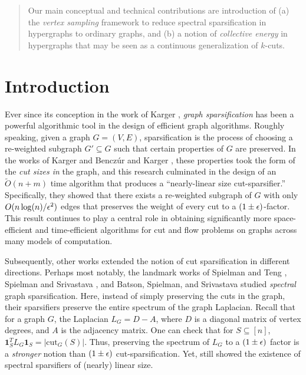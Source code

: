 \documentclass{article}
\begin{document}
\begin{abstract}
Our main conceptual and technical contributions are introduction of (a) the \textit{vertex sampling} framework to reduce spectral sparsification in hypergraphs to ordinary graphs, and (b)   
a notion of \textit{collective energy} in hypergraphs that may be seen
as a continuous generalization of $k$-cuts. 

\end{abstract}

\pagebreak

\setcounter{tocdepth}{2}
\tableofcontents

\pagebreak


\section{Introduction}

Ever since its conception in the work of Karger \cite{Kar93}, \emph{graph sparsification} has been a powerful algorithmic tool in the design of efficient graph algorithms. Roughly speaking, given a graph $G = (V, E)$, sparsification is the process of choosing a re-weighted subgraph $G' \subseteq G$ such that certain properties of $G$ are preserved. In the works of Karger \cite{Kar93} and Bencz\'ur and Karger \cite{BK96}, these properties took the form of the \emph{cut sizes in} the graph, and this research culminated in the design of an $\widetilde{O}(n + m)$ time algorithm that produces a ``nearly-linear size cut-sparsifier.'' Specifically, they showed that there exists a re-weighted subgraph of $G$ with only $O(n \log (n) / \epsilon^2)$ edges that preserves the weight of every cut to a $(1 \pm \epsilon)$-factor. This result continues to play a central role in obtaining significantly more space-efficient and time-efficient algorithms for cut and flow problems on graphs across many models of computation.


Subsequently, other works extended the notion of cut sparsification in different directions. Perhaps most notably, the landmark
works of Spielman and Teng \cite{ST11},
Spielman and Srivastava \cite{SS11},
and Batson, Spielman, and Srivastava \cite{BatsonSS12} studied \emph{spectral} graph sparsification. Here, instead of simply preserving the cuts in the graph, their sparsifiers preserve the entire spectrum of the graph Laplacian. Recall that for a graph $G$, the Laplacian $L_G = D - A$, where $D$ is a diagonal matrix of vertex degrees, and $A$ is the adjacency matrix. One can check that for $S \subseteq [n]$, $\mathbf{1}_S^T L_G \mathbf{1}_S = |\mathrm{cut}_G(S)|$. Thus, preserving the spectrum of $L_G$ to a $(1 \pm \epsilon)$ factor is a \emph{stronger} notion than $(1 \pm \epsilon)$ cut-sparsification.
Yet, \cite{ST11,SS11,BatsonSS12} still showed the existence of spectral sparsifiers of (nearly) linear size.
\end{document}
